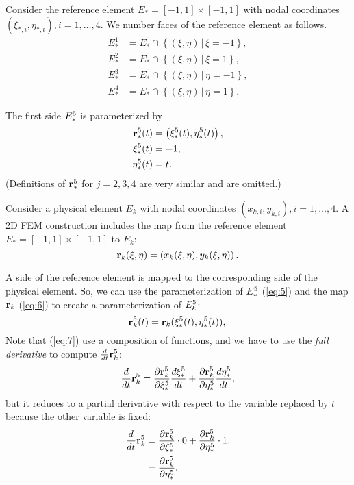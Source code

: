 \documentclass[11pt]{article}
\begin{document}
Consider the reference element $E_{*} = [-1, 1] \times [-1,1]$ with nodal coordinates
$(\xi_{*,i}, \eta_{*,i}), i=1,\dots,4$.
We number faces of the reference element as follows.
\begin{equation}
\label{eq:4}
\begin{aligned}
E_{*}^{1} &=  E_{*} \cap \left \{ (\xi, \eta)\, |\, \xi = -1 \right \},\\
E_{*}^{2} &=  E_{*} \cap \left \{ (\xi, \eta)\, |\, \xi = 1  \right \},\\
E_{*}^{3} &=  E_{*} \cap \left \{ (\xi, \eta)\, |\, \eta = -1 \right \},\\
E_{*}^{4} &=  E_{*} \cap \left \{ (\xi, \eta)\, |\, \eta = 1  \right \}.
\end{aligned}
\end{equation}

The first side $E_{*}^{5}$ is parameterized by
\begin{equation}
  \label{eq:5}
  \begin{aligned}
      \mathbf{r}_{*}^{5}(t) &= \left(\xi_{*}^{5}(t), \eta_{*}^{5}(t) \right),\\
      \xi_{*}^{5}(t) &= -1,\\
      \eta_{*}^{5}(t) &= t.
  \end{aligned}
\end{equation}
(Definitions of $\mathbf{r}_{*}^{5}$ for $j = 2, 3, 4$ are very similar and
are omitted.)

Consider a physical element $E_{k}$ with nodal coordinates $(x_{k,i}, y_{k,i}), i = 1,\dots,4$.
A 2D FEM construction includes the map from the reference element
$E_{*} = [-1, 1] \times [-1,1]$ to $E_{k}$:
\begin{equation}
\label{eq:6}
\mathbf{r}_{k}(\xi,\eta) = \left( x_{k}(\xi,\eta), y_{k}(\xi,\eta) \right).
\end{equation}

A side of the reference element is mapped to the corresponding side of
the physical element. So, we can use the parameterization of
$E_{*}^{5}$ (\ref{eq:5}) and the map $\mathbf{r}_{k}$ (\ref{eq:6}) to create a parameterization of
$E_{k}^{5}$:
\begin{equation}
  \label{eq:7}
  \mathbf{r}_{k}^{5}(t) = \mathbf{r}_{k}(\xi_{*}^{5}(t), \eta_{*}^{5}(t)),\\
\end{equation}
Note that (\ref{eq:7}) use a composition of functions, and we have to
use the \emph{full derivative} to compute $\frac{d}{dt}\mathbf{r}_{k}^{5}$:
\begin{equation}
  \label{eq:8}
  \frac{d }{d t}\mathbf{r}_{k}^{5} = \frac{\partial \mathbf{r}_{k}^{5}}{\partial \xi_{*}^{5}} \frac{d \xi_{*}^{5}}{d t} + \frac{\partial \mathbf{r}_{k}^{5}}{\partial \eta_{*}^{5}} \frac{d \eta_{*}^{5}}{d t},
\end{equation}
but it reduces to a partial derivative with respect to the variable
replaced by $t$ because the other variable is fixed:
\begin{equation}
  \label{eq:9}
  \begin{aligned}
  \frac{d }{d t}\mathbf{r}_{k}^{5} &= \frac{\partial \mathbf{r}_{k}^{5}}{\partial \xi_{*}^{5}}\cdot 0 + \frac{\partial \mathbf{r}_{k}^{5}}{\partial \eta_{*}^{5}} \cdot 1,\\
    &=\frac{\partial \mathbf{r}_{k}^{5}}{\partial \eta_{*}^{5}}.
  \end{aligned}
\end{equation}
\end{document}

